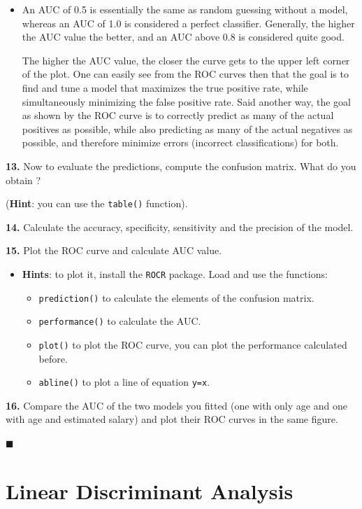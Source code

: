 \documentclass[]{book}
\providecommand{\tightlist}{%
  \setlength{\itemsep}{0pt}\setlength{\parskip}{0pt}}
\newenvironment{rmdblock}[1]
  {\begin{shaded*}
  \begin{itemize}
  \renewcommand{\labelitemi}{
    \raisebox{-.7\height}[0pt][0pt]{
      {\setkeys{Gin}{width=2em,keepaspectratio}\texttt{[image: img/icons/\#1]}}
    }
  }
  \item
  }
  {
  \end{itemize}
  \end{shaded*}
  }
\newenvironment{rmdinsight}
  {\begin{rmdblock}{insight}}
  {\end{rmdblock}}
\begin{document}
\begin{rmdinsight}
An AUC of 0.5 is essentially the same as random guessing without a
model, whereas an AUC of 1.0 is considered a perfect classifier.
Generally, the higher the AUC value the better, and an AUC above 0.8 is
considered quite good.

The higher the AUC value, the closer the curve gets to the upper left
corner of the plot. One can easily see from the ROC curves then that the
goal is to find and tune a model that maximizes the true positive rate,
while simultaneously minimizing the false positive rate. Said another
way, the goal as shown by the ROC curve is to correctly predict as many
of the actual positives as possible, while also predicting as many of
the actual negatives as possible, and therefore minimize errors
(incorrect classifications) for both.
\end{rmdinsight}

\textbf{13.} Now to evaluate the predictions, compute the confusion
matrix. What do you obtain ?

(\textbf{Hint}: you can use the \texttt{table()} function).

\textbf{14.} Calculate the accuracy, specificity, sensitivity and the
precision of the model.

\textbf{15.} Plot the ROC curve and calculate AUC value.

\begin{rmdinsight}
\textbf{Hints}: to plot it, install the \texttt{ROCR} package. Load and
use the functions:

\begin{itemize}
\tightlist
\item
  \texttt{prediction()} to calculate the elements of the confusion
  matrix.
\item
  \texttt{performance()} to calculate the AUC.
\item
  \texttt{plot()} to plot the ROC curve, you can plot the performance
  calculated before.
\item
  \texttt{abline()} to plot a line of equation \texttt{y=x}.
\end{itemize}
\end{rmdinsight}

\textbf{16.} Compare the AUC of the two models you fitted (one with only
age and one with age and estimated salary) and plot their ROC curves in
the same figure.

◼

\chapter{Linear Discriminant
Analysis}\label{linear-discriminant-analysis}
\end{document}
